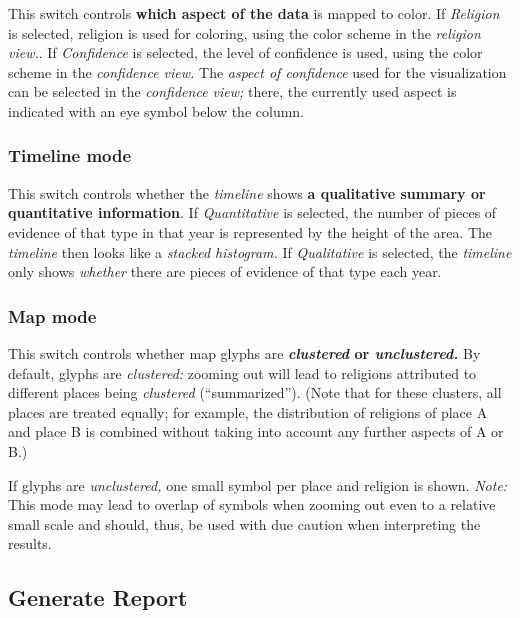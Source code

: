 This switch controls \textbf{which aspect of the data} is mapped to color.
If \emph{Religion} is selected, religion is used for coloring, using the color scheme in the \emph{religion view.}.
If \emph{Confidence} is selected, the level of confidence is used, using the color scheme in the \emph{confidence view.}
The \emph{aspect of confidence} used for the visualization can be selected in the \emph{confidence view;}
there, the currently used aspect is indicated with an eye symbol below the column.


\subsubsection{Timeline mode}
\label{sec:settings-timeline-mode}

This switch controls whether the \emph{timeline} shows \textbf{a qualitative summary or quantitative information}.
If \emph{Quantitative} is selected, the number of pieces of evidence of that type in that year is represented by the height of the area.
The \emph{timeline} then looks like a \emph{stacked histogram.}
If \emph{Qualitative} is selected, the \emph{timeline} only shows \emph{whether} there are pieces of evidence of that type each year.


\subsubsection{Map mode}
\label{sec:settings-map-mode}

This switch controls whether map glyphs are \textbf{\emph{clustered} or \emph{unclustered.}}
By default, glyphs are \emph{clustered:}
zooming out will lead to religions attributed to different places being \emph{clustered} (\enquote{summarized}).
(Note that for these clusters, all places are treated equally;
for example, the distribution of religions of place A and place B is combined without taking into account any further aspects of A or B.)

If glyphs are \emph{unclustered,} one small symbol per place and religion is shown.
\emph{Note:} This mode may lead to overlap of symbols when zooming out even to a relative small scale and should, thus, be used with due caution when interpreting the results.


\subsection{Generate Report}
\label{sec:generate-report}

